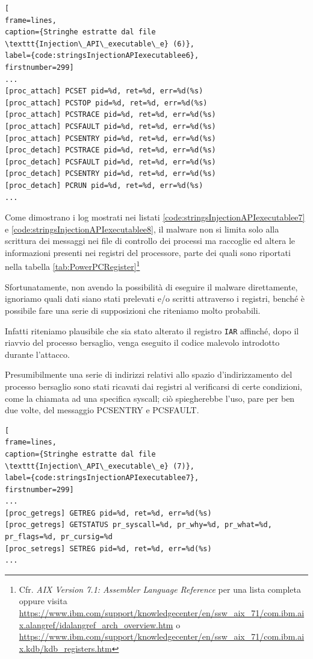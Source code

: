 \documentclass[10pt,a4paper, titlepage]{report}
\begin{document}
\begin{lstlisting}[
frame=lines, 
caption={Stringhe estratte dal file \texttt{Injection\_API\_executable\_e} (6)}, 
label={code:stringsInjectionAPIexecutablee6},
firstnumber=299]
...
[proc_attach] PCSET pid=%d, ret=%d, err=%d(%s)
[proc_attach] PCSTOP pid=%d, ret=%d, err=%d(%s)
[proc_attach] PCSTRACE pid=%d, ret=%d, err=%d(%s)
[proc_attach] PCSFAULT pid=%d, ret=%d, err=%d(%s)
[proc_attach] PCSENTRY pid=%d, ret=%d, err=%d(%s)
[proc_detach] PCSTRACE pid=%d, ret=%d, err=%d(%s)
[proc_detach] PCSFAULT pid=%d, ret=%d, err=%d(%s)
[proc_detach] PCSENTRY pid=%d, ret=%d, err=%d(%s)
[proc_detach] PCRUN pid=%d, ret=%d, err=%d(%s)
...
\end{lstlisting}

Come dimostrano i log mostrati nei listati \ref{code:stringsInjectionAPIexecutablee7} e \ref{code:stringsInjectionAPIexecutablee8}, il malware non si limita solo alla scrittura dei messaggi nei file di controllo dei processi ma raccoglie ed altera le informazioni presenti nei registri del processore, parte dei quali sono riportati nella tabella \ref{tab:PowerPCRegister}\footnote{Cfr. \textit{AIX Version 7.1: Assembler Language Reference} per una lista completa oppure visita \url{https://www.ibm.com/support/knowledgecenter/en/ssw\_aix\_71/com.ibm.aix.alangref/idalangref\_arch\_overview.htm} o \url{https://www.ibm.com/support/knowledgecenter/en/ssw\_aix\_71/com.ibm.aix.kdb/kdb\_registers.htm}}

Sfortunatamente, non avendo la possibilità di eseguire il malware direttamente, ignoriamo quali dati siano stati prelevati e/o scritti attraverso i registri, benché è possibile fare una serie di supposizioni che riteniamo molto probabili.

Infatti riteniamo plausibile che sia stato alterato il registro \texttt{IAR} affinché, dopo il riavvio del processo bersaglio, venga eseguito il codice malevolo introdotto durante l'attacco. 

Presumibilmente una serie di indirizzi relativi allo spazio d'indirizzamento del processo bersaglio sono stati ricavati dai registri al verificarsi di certe condizioni, come la chiamata ad una specifica syscall; ciò spiegherebbe l'uso, pare per ben due volte, del messaggio PCSENTRY e PCSFAULT.  

\begin{lstlisting}[
frame=lines, 
caption={Stringhe estratte dal file \texttt{Injection\_API\_executable\_e} (7)}, 
label={code:stringsInjectionAPIexecutablee7},
firstnumber=299]
...
[proc_getregs] GETREG pid=%d, ret=%d, err=%d(%s)
[proc_getregs] GETSTATUS pr_syscall=%d, pr_why=%d, pr_what=%d, pr_flags=%d, pr_cursig=%d
[proc_setregs] SETREG pid=%d, ret=%d, err=%d(%s)
...
\end{lstlisting}
\end{document}
